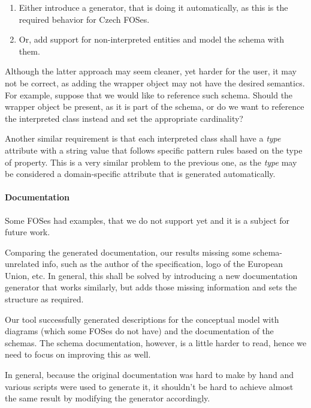 \begin{enumerate}
    \item Either introduce a generator, that is doing it automatically, as this is the required behavior for Czech FOSes.
    \item Or, add support for non-interpreted entities and model the schema with them.
\end{enumerate}

Although the latter approach may seem cleaner, yet harder for the user, it may not be correct, as adding the wrapper object may not have the desired semantics. For example, suppose that we would like to reference such schema. Should the wrapper object be present, as it is part of the schema, or do we want to reference the interpreted class instead and set the appropriate cardinality?

\smallskip

Another similar requirement is that each interpreted class shall have a \textit{type} attribute with a string value that follows specific pattern rules based on the type of property. This is a very similar problem to the previous one, as the \textit{type} may be considered a domain-specific attribute that is generated automatically.

\paragraph{Documentation} Some FOSes had examples, that we do not support yet and it is a subject for future work.

Comparing the generated documentation, our results missing some schema-unrelated info, such as the author of the specification, logo of the European Union, etc. In general, this shall be solved by introducing a new documentation generator that works similarly, but adds those missing information and sets the structure as required.

Our tool successfully generated descriptions for the conceptual model with diagrams (which some FOSes do not have) and the documentation of the schemas. The schema documentation, however, is a little harder to read, hence we need to focus on improving this as well.

In general, because the original documentation was hard to make by hand and various scripts were used to generate it, it shouldn't be hard to achieve almost the same result by modifying the generator accordingly.
